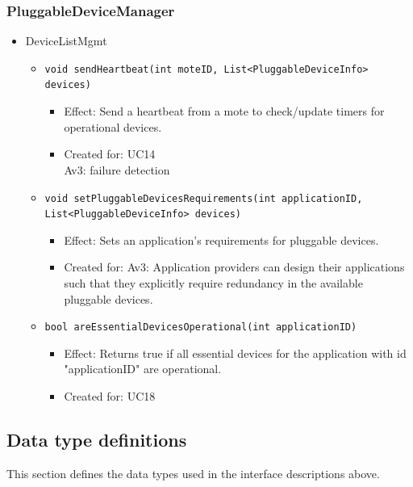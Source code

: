     \subsubsection{PluggableDeviceManager}
        \begin{itemize}
        	\item DeviceListMgmt
        	\begin{itemize}
        		\item \texttt{void sendHeartbeat(int moteID, List<PluggableDeviceInfo> devices)}
        		\begin{itemize}
        			\item Effect: Send a heartbeat from a mote to check/update timers for operational devices.
        			\item Created for: UC14 \\
                          Av3: failure detection
        		\end{itemize}
                \item \texttt{void setPluggableDevicesRequirements(int applicationID, List<PluggableDeviceInfo> devices)}
                \begin{itemize}
                    \item Effect: Sets an application's requirements for pluggable devices.
                    \item Created for: Av3: Application providers can design their applications
                          such that they explicitly require redundancy in
                          the available pluggable devices.
                \end{itemize}
        		\item \texttt{bool areEssentialDevicesOperational(int applicationID)}
        		\begin{itemize}
        			\item Effect: Returns true if all essential devices for the application
                                  with id "applicationID" are operational.
        			\item Created for: UC18
        		\end{itemize}
        	\end{itemize}
        \end{itemize}


\subsection{Data type definitions}
    This section defines the data types used in the interface descriptions above.

